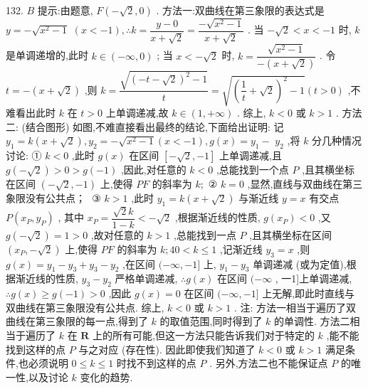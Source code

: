 132. $B$ 提示:由题意, $F\left( {-\sqrt{2},0}\right)$ . 方法一:双曲线在第三象限的表达式是 $y =  - \sqrt{{x}^{2} - 1}$  $\left( {x <  - 1}\right) ,\therefore k = \dfrac{y - 0}{x + \sqrt{2}} = \dfrac{-\sqrt{{x}^{2} - 1}}{x + \sqrt{2}}$ . 当 $- \sqrt{2} < x <  - 1$ 时, $k$ 是单调递增的,此时 $k \in  \left( {-\infty ,0}\right)$ ; 当 $x <  - \sqrt{2}$ 时, $k = \dfrac{\sqrt{{x}^{2} - 1}}{-\left( {x + \sqrt{2}}\right) }$ . 令 $t =  - \left( {x + \sqrt{2}}\right)$ ,则 $k = \dfrac{\sqrt{{\left( -t - \sqrt{2}\right) }^{2} - 1}}{t} = \sqrt{{\left( \dfrac{1}{t} + \sqrt{2}\right) }^{2} - 1}\left( {t > 0}\right)$ ,不难看出此时 $k$ 在 $t > 0$ 上单调递减,故 $k \in  \left( {1, + \infty }\right)$ . 综上, $k < 0$ 或 $k > 1$ . 方法二: (结合图形) 如图,不难直接看出最终的结论,下面给出证明: 记 ${y}_{1} = k\left( {x + \sqrt{2}}\right) ,{y}_{2} =  - \sqrt{{x}^{2} - 1}\left( {x <  - 1}\right) ,g\left( x\right)  = {y}_{1} -$  ${y}_{2}$ ,将 $k$ 分几种情况讨论: ① $k < 0$ ,此时 $g\left( x\right)$ 在区间 $\left\lbrack  {-\sqrt{2}, - 1}\right\rbrack$ 上单调递减,且 $g\left( {-\sqrt{2}}\right)  > 0 > g\left( {-1}\right)$ ,因此,对任意的 $k < 0$ ,总能找到一个点 $P$ ,且其横坐标在区间 $\left( {-\sqrt{2}, - 1}\right)$ 上,使得 ${PF}$ 的斜率为 $k;\text{ ② }k = 0$ ,显然,直线与双曲线在第三象限没有公共点； $\text{ ③ }k > 1$ ,此时 ${y}_{1} = k\left( {x + \sqrt{2}}\right)$ 与渐近线 $y = x$ 有交点 $P\left( {{x}_{P},{y}_{P}}\right)$ , 其中 ${x}_{P} = \dfrac{\sqrt{2}k}{1 - k} <  - \sqrt{2}$ ,根据渐近线的性质, $g\left( {x}_{P}\right)  < 0$ ,又 $g\left( {-\sqrt{2}}\right)  = 1 > 0$ ,故对任意的 $k > 1$ ,总能找到一点 $P$ ,且其横坐标在区间 $\left( {{x}_{P}, - \sqrt{2}}\right)$ 上,使得 ${PF}$ 的斜率为 $k;{40} < k \leq  1$ ,记渐近线 ${y}_{3} = x$ ,则 $g\left( x\right)  = {y}_{1} - {y}_{3} + {y}_{3} - {y}_{2}$ ,在区间 $( - \infty , - 1\rbrack$ 上, ${y}_{1} - {y}_{3}$ 单调递减 (或为定值),根据渐近线的性质, ${y}_{3} - {y}_{2}$ 严格单调递减, $\therefore g\left( x\right)$ 在区间 $( - \infty$ , 一1]上单调递减, $\therefore g\left( x\right)  \geq  g\left( {-1}\right)  > 0$ ,因此 $g\left( x\right)  = 0$ 在区间 $( - \infty , - 1\rbrack$ 上无解,即此时直线与双曲线在第三象限没有公共点. 综上, $k < 0$ 或 $k > 1$ . 注: 方法一相当于遍历了双曲线在第三象限的每一点,得到了 $k$ 的取值范围,同时得到了 $k$ 的单调性. 方法二相当于遍历了 $k$ 在 $\mathbf{R}$ 上的所有可能,但这一方法只能告诉我们对于特定的 $k$ ,能不能找到这样的点 $P$ 与之对应 (存在性). 因此即使我们知道了 $k < 0$ 或 $k > 1$ 满足条件,也必须说明 $0 \leq  k \leq  1$ 时找不到这样的点 $P$ . 另外,方法二也不能保证点 $P$ 的唯一性,以及讨论 $k$ 变化的趋势.

